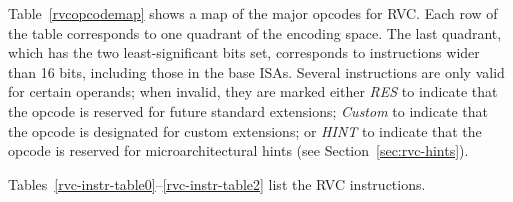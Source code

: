 Table~\ref{rvcopcodemap} shows a map of the major opcodes for RVC.
Each row of the table corresponds to one quadrant of the encoding
space.  The last quadrant, which has the two
least-significant bits set, corresponds to instructions wider
than 16 bits, including those in the base ISAs.  Several instructions
are only valid for certain operands; when invalid, they are marked
either {\em RES} to indicate that the opcode is reserved for future
standard extensions; {\em Custom} to indicate that the opcode is designated
for custom extensions; or {\em HINT} to indicate that the opcode
is reserved for microarchitectural hints (see Section~\ref{sec:rvc-hints}).



Tables~\ref{rvc-instr-table0}--\ref{rvc-instr-table2} list the RVC instructions.

